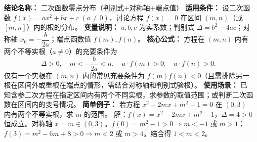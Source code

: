 \textbf{结论名称：} 二次函数零点分布（判别式+对称轴+端点值）\newline
\textbf{适用条件：} 设二次函数 $f(x)=ax^2+bx+c\ (a\neq0)$，讨论方程 $f(x)=0$ 在区间 $(m,n)$（或 $[m,n]$）内的根的分布。\newline
\textbf{变量说明：} $a,b,c$ 为实系数；判别式 $\Delta=b^2-4ac$；对称轴 $x_0=-\dfrac{b}{2a}$；端点函数值 $f(m),f(n)$。\newline
\textbf{核心公式：}
方程在 $(m,n)$ 内有两个不等实根（$a\neq0$）的充要条件为
\[
\boxed{\Delta>0,\quad m<-\frac{b}{2a}<n,\quad a\cdot f(m)>0,\quad a\cdot f(n)>0 }.
\]
仅有一个实根在 $(m,n)$ 内的常见充要条件为 $f(m)f(n)<0$（且需排除另一根在区间外或重根在端点的情形，需结合对称轴和判别式验根）。\newline
\textbf{使用场景：} 已知含参二次方程在指定区间内有两个不同实根，求参数的取值范围；或判断二次函数在区间内的变号情况。\newline
\textbf{简单例子：} 若方程 $x^2-2mx+m^2-1=0$ 在 $(0,3)$ 内有两个不等实根，求 $m$ 的范围。\newline
解：$f(x)=x^2-2mx+m^2-1$，$\Delta=4>0$ 恒成立。对称轴 $x=m\in(0,3)$。$f(0)=m^2-1>0\Rightarrow m<-1$ 或 $m>1$；$f(3)=m^2-6m+8>0\Rightarrow m<2$ 或 $m>4$。结合得 $1<m<2$。